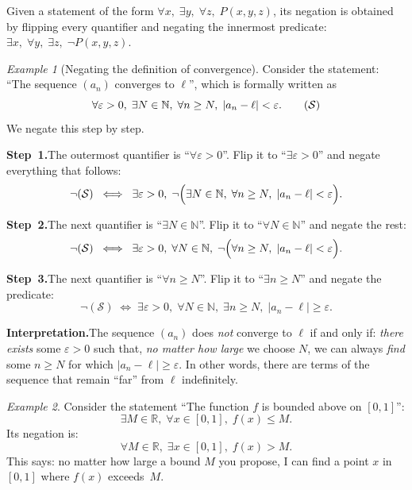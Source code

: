 \documentclass[12pt,a4paper,openany]{book}
\newcommand{\N}{\mathbb{N}}
\newcommand{\R}{\mathbb{R}}
\newcommand{\eps}{\varepsilon}
\newcommand{\abs}[1]{\left\lvert #1 \right\rvert}
\theoremstyle{definition}
\theoremstyle{remark}
\newtheorem{example}{Example}[chapter]
\begin{document}
\begin{strategy}
  Given a statement of the form
  $\forall x,\; \exists y,\; \forall z,\; P(x,y,z)$,
  its negation is obtained by flipping every quantifier and negating the
  innermost predicate:
  $\exists x,\; \forall y,\; \exists z,\; \neg P(x,y,z)$.
\end{strategy}

\begin{example}[Negating the definition of convergence]
\label{ex:negate-convergence}
Consider the statement: ``The sequence $(a_n)$ converges to $\ell$'', which
is formally written as
\[
  \forall \eps > 0,\; \exists N \in \N,\; \forall n \geq N,\;
  \abs{a_n - \ell} < \eps.
  \tag{$\mathcal{S}$}
\]
We negate this step by step.

\textbf{Step~1.}\quad The outermost quantifier is ``$\forall \eps>0$''.
Flip it to ``$\exists \eps>0$'' and negate everything that follows:
\[
  \neg(\mathcal{S}) \;\iff\;
  \exists \eps > 0,\; \neg\Bigl(
    \exists N \in \N,\; \forall n \geq N,\;
    \abs{a_n - \ell} < \eps
  \Bigr).
\]

\textbf{Step~2.}\quad The next quantifier is ``$\exists N \in \N$''.
Flip it to ``$\forall N \in \N$'' and negate the rest:
\[
  \neg(\mathcal{S}) \;\iff\;
  \exists \eps > 0,\; \forall N \in \N,\; \neg\Bigl(
    \forall n \geq N,\;
    \abs{a_n - \ell} < \eps
  \Bigr).
\]

\textbf{Step~3.}\quad The next quantifier is ``$\forall n \geq N$''.
Flip it to ``$\exists n \geq N$'' and negate the predicate:
\[
  \neg(\mathcal{S}) \;\iff\;
  \exists \eps > 0,\; \forall N \in \N,\; \exists n \geq N,\;
  \abs{a_n - \ell} \geq \eps.
\]

\textbf{Interpretation.}\quad The sequence $(a_n)$ does \emph{not} converge
to $\ell$ if and only if: \emph{there exists} some $\eps > 0$ such that,
\emph{no matter how large} we choose $N$, we can always \emph{find} some
$n \geq N$ for which $\abs{a_n-\ell} \geq \eps$.  In other words, there
are terms of the sequence that remain ``far'' from $\ell$ indefinitely.
\end{example}

\begin{example}\label{ex:negate-bounded}
Consider the statement ``The function $f$ is bounded above on $[0,1]$'':
\[
  \exists M \in \R,\; \forall x \in [0,1],\; f(x) \leq M.
\]
Its negation is:
\[
  \forall M \in \R,\; \exists x \in [0,1],\; f(x) > M.
\]
This says: no matter how large a bound $M$ you propose, I can find a point
$x$ in $[0,1]$ where $f(x)$ exceeds~$M$.
\end{example}
\end{document}
